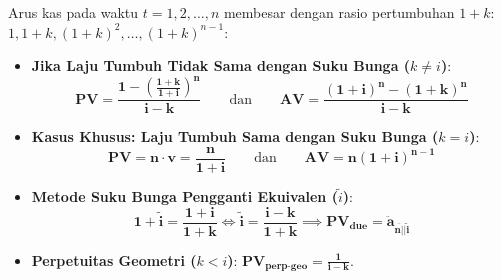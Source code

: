 \documentclass[10pt,a4paper]{article}
\newcommand{\angl}[1]{\overline{#1|}}
\begin{document}
\begin{rumusbox}
Arus kas pada waktu $t = 1, 2, \dots, n$ membesar dengan rasio pertumbuhan $1+k$: $1, 1+k, (1+k)^2, \dots, (1+k)^{n-1}$:
\begin{itemize}[leftmargin=1.5em, topsep=1.5pt, itemsep=2pt]
    \item \textbf{Jika Laju Tumbuh Tidak Sama dengan Suku Bunga ($k \ne i$)}:
    \begin{equation*}
        \mathbf{PV = \frac{1 - \left( \frac{1+k}{1+i} \right)^n}{i - k}} \qquad\text{dan}\qquad \mathbf{AV = \frac{(1+i)^n - (1+k)^n}{i - k}}
    \end{equation*}
    \item \textbf{Kasus Khusus: Laju Tumbuh Sama dengan Suku Bunga ($k = i$)}:
    \begin{equation*}
        \mathbf{PV = n \cdot v = \frac{n}{1+i}} \qquad\text{dan}\qquad \mathbf{AV = n(1+i)^{n-1}}
    \end{equation*}
    \item \textbf{Metode Suku Bunga Pengganti Ekuivalen ($\tilde{i}$)}:
    \begin{equation*}
        \mathbf{1 + \tilde{i} = \frac{1+i}{1+k} \iff \tilde{i} = \frac{i - k}{1 + k}} \implies \mathbf{PV_{\text{due}} = \ddot{a}_{\angl{n}|\tilde{i}}}
    \end{equation*}
    \item \textbf{Perpetuitas Geometri ($k < i$)}: $\mathbf{PV_{\text{perp-geo}} = \frac{1}{i - k}}$.
\end{itemize}
\end{rumusbox}
\end{document}
